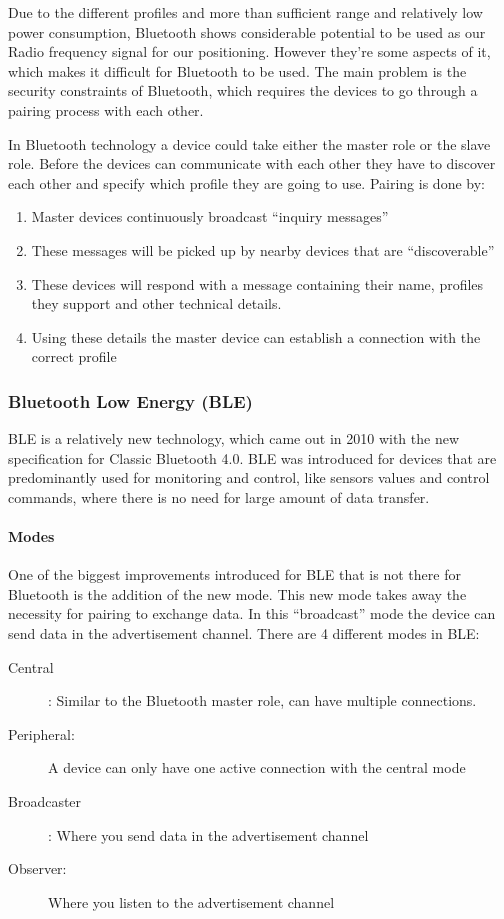 Due to the different profiles and more than sufficient range and relatively
low power consumption, Bluetooth shows considerable potential to be
used as our Radio frequency signal for our positioning. However they\textquoteright re
some aspects of it, which makes it difficult for Bluetooth to be used.
The main problem is the security constraints of Bluetooth, which requires
the devices to go through a pairing process with each other. 

In Bluetooth technology a device could take either the master role
or the slave role. Before the devices can communicate with each other
they have to discover each other and specify which profile they are
going to use. Pairing is done by: 
\begin{enumerate}
\item Master devices continuously broadcast \textquotedblleft inquiry messages\textquotedblright{}
\item These messages will be picked up by nearby devices that are \textquotedblleft discoverable\textquotedblright{} 
\item These devices will respond with a message containing their name, profiles
they support and other technical details. 
\item Using these details the master device can establish a connection with
the correct profile 
\end{enumerate}

\subsubsection{Bluetooth Low Energy (BLE)}

BLE is a relatively new technology, which came out in 2010 with the
new specification for Classic Bluetooth 4.0. BLE was introduced for
devices that are predominantly used for monitoring and control, like
sensors values and control commands, where there is no need for large
amount of data transfer.


\paragraph*{Modes\protect \\
}

One of the biggest improvements introduced for BLE that is not there
for Bluetooth is the addition of the new mode. This new mode takes
away the necessity for pairing to exchange data. In this \textquotedblleft broadcast\textquotedblright{}
mode the device can send data in the advertisement channel. There
are 4 different modes in BLE: 
\begin{description}
\item [{Central}] : Similar to the Bluetooth master role, can have multiple
connections. 
\item [{Peripheral:}] A device can only have one active connection with
the central mode 
\item [{Broadcaster}] : Where you send data in the advertisement channel
\item [{Observer:}] Where you listen to the advertisement channel
\end{description}


